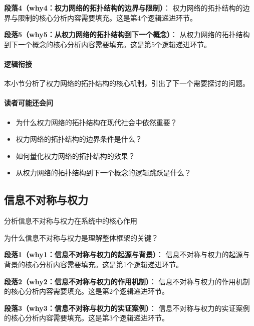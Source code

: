 \documentclass[../main.tex]{subfiles}
\begin{document}
{{\textbf{段落4（why4：权力网络的拓扑结构的边界与限制）}：
权力网络的拓扑结构的边界与限制的核心分析内容需要填充。这是第4个逻辑递进环节。


\textbf{段落5（why5：从权力网络的拓扑结构到下一个概念）}：
从权力网络的拓扑结构到下一个概念的核心分析内容需要填充。这是第5个逻辑递进环节。


\paragraph*{逻辑衔接}
本小节分析了权力网络的拓扑结构的核心机制，引出了下一个需要探讨的问题。

\paragraph*{读者可能还会问}
\begin{itemize}
\item 为什么权力网络的拓扑结构在现代社会中依然重要？
\item 权力网络的拓扑结构的边界条件是什么？
\item 如何量化权力网络的拓扑结构的效果？
\item 从权力网络的拓扑结构到下一个概念的逻辑跳跃是什么？
\end{itemize}


\subsection{信息不对称与权力}

\begin{motivation}
分析信息不对称与权力在系统中的核心作用
\end{motivation}

\begin{logicmap}
[逻辑链占位]
\end{logicmap}

\begin{questionbox}
为什么信息不对称与权力是理解整体框架的关键？
\end{questionbox}

\textbf{段落1（why1：信息不对称与权力的起源与背景）}：
信息不对称与权力的起源与背景的核心分析内容需要填充。这是第1个逻辑递进环节。


\textbf{段落2（why2：信息不对称与权力的作用机制）}：
信息不对称与权力的作用机制的核心分析内容需要填充。这是第2个逻辑递进环节。


\textbf{段落3（why3：信息不对称与权力的实证案例）}：
信息不对称与权力的实证案例的核心分析内容需要填充。这是第3个逻辑递进环节。


}}
\end{document}
